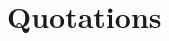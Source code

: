 \documentclass[10pt, a4paper]{report}
\begin{document}
\section*{Quotations}

%
%
%
%

%
%
\end{document}
